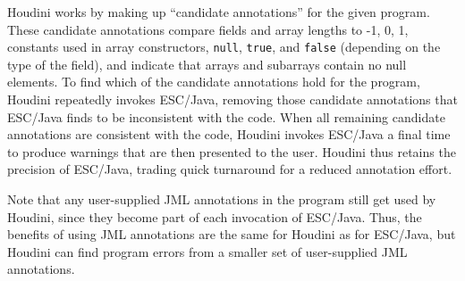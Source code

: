 Houdini works by making up ``candidate annotations'' for the given
program.  These candidate annotations compare fields and array lengths
to -1, 0, 1, constants used in array constructors, \texttt{null},
\texttt{true}, and \texttt{false} (depending on the type of the
field), and indicate that arrays and subarrays contain no null
elements.  To find which of the candidate annotations hold for the
program, Houdini repeatedly invokes ESC/Java, removing those candidate
annotations that ESC/Java finds to be inconsistent with the code.
When all remaining candidate annotations are consistent with the code,
Houdini invokes ESC/Java a final time to produce warnings that are
then presented to the user.  Houdini thus retains the precision of
ESC/Java, trading quick turnaround for a reduced annotation effort.

Note that any user-supplied JML annotations in the program still get
used by Houdini, since they become part of each invocation of
ESC/Java.  Thus, the benefits of using JML annotations are the same
for Houdini as for ESC/Java, but Houdini can find program errors from
a smaller set of user-supplied JML annotations.

